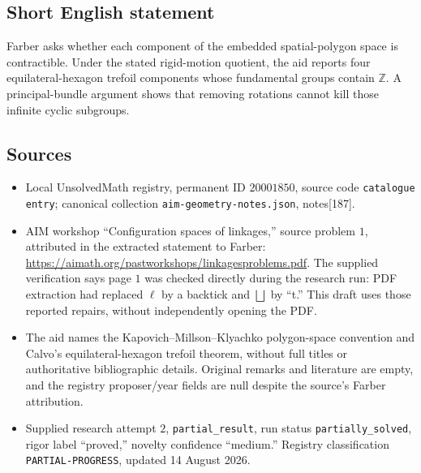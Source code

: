 \documentclass[11pt]{article}
\newcommand{\Z}{\mathbb{Z}}
\begin{document}
\subsection{Short English statement}
Farber asks whether each component of the embedded spatial-polygon space is contractible. Under the stated rigid-motion quotient, the aid reports four equilateral-hexagon trefoil components whose fundamental groups contain \(\Z\). A principal-bundle argument shows that removing rotations cannot kill those infinite cyclic subgroups.
\subsection{Sources}
\begin{itemize}
\item Local UnsolvedMath registry, permanent ID \(20001850\), source code \texttt{catalogue entry}; canonical collection \texttt{aim-geometry-notes.json}, notes[187].
\item AIM workshop ``Configuration spaces of linkages,'' source problem \(1\), attributed in the extracted statement to Farber: \url{https://aimath.org/pastworkshops/linkagesproblems.pdf}. The supplied verification says page \(1\) was checked directly during the research run: PDF extraction had replaced \(\ell\) by a backtick and \(\bigsqcup\) by ``t.'' This draft uses those reported repairs, without independently opening the PDF.
\item The aid names the Kapovich--Millson--Klyachko polygon-space convention and Calvo's equilateral-hexagon trefoil theorem, without full titles or authoritative bibliographic details. Original remarks and literature are empty, and the registry proposer/year fields are null despite the source's Farber attribution.
\item Supplied research attempt \(2\), \texttt{partial\_result}, run status \texttt{partially\_solved}, rigor label ``proved,'' novelty confidence ``medium.'' Registry classification \texttt{PARTIAL-PROGRESS}, updated 14 August 2026.
\end{itemize}
\end{document}
